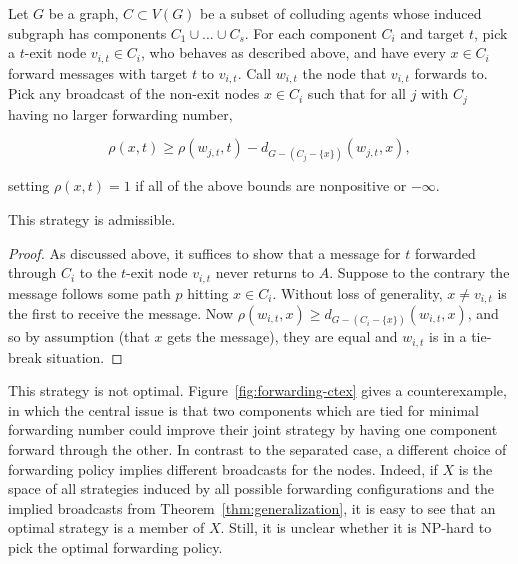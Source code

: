 \documentclass[prodmode,acmec]{ec-acmsmall}
\begin{document}
\begin{theorem}\label{thm:generalization}

Let $G$ be a graph, $C \subset V(G)$ be a subset of colluding agents whose
induced subgraph has components $C_1 \cup \dots \cup C_s$. For each component
$C_i$ and target $t$, pick a $t$-exit node $v_{i,t} \in C_i$, who behaves as
described above, and have every $x \in C_i$ forward messages with target $t$ to
$v_{i,t}$. Call $w_{i,t}$ the node that $v_{i,t}$ forwards to. Pick any
broadcast of the non-exit nodes $x \in C_i$ such that for all $j$ with $C_j$
having no larger forwarding number,

\[ 
    \rho(x,t) \geq \rho(w_{j,t},t) - d_{G-(C_j - \{ x \} )}(w_{j,t}, x),
\]

setting $\rho(x,t) = 1$ if all of the above bounds are nonpositive or
$-\infty$. 

This strategy is admissible.

\end{theorem}

\begin{proof}

As discussed above, it suffices to show that a message for $t$ forwarded
through $C_i$ to the $t$-exit node $v_{i,t}$ never returns to $A$. Suppose to
the contrary the message follows some path $p$ hitting $x \in C_i$. Without
loss of generality, $x \neq v_{i,t}$ is the first to receive the message. Now
$\rho(w_{i,t}, x) \geq d_{G-(C_i - \{ x \})}(w_{i,t}, x)$, and so by assumption
(that $x$ gets the message), they are equal and $w_{i,t}$ is in a tie-break
situation.
\end{proof}

This strategy is not optimal. Figure~\ref{fig:forwarding-ctex} gives a
counterexample, in which the central issue is that two components which are
tied for minimal forwarding number could improve their joint strategy by having
one component forward through the other. In contrast to the separated case, a
different choice of forwarding policy implies different broadcasts for the
nodes. Indeed, if $X$ is the space of all strategies induced by all possible
forwarding configurations and the implied broadcasts from
Theorem~\ref{thm:generalization}, it is easy to see that an optimal strategy is
a member of $X$.  Still, it is unclear whether it is NP-hard to pick the
optimal forwarding policy.
\end{document}
